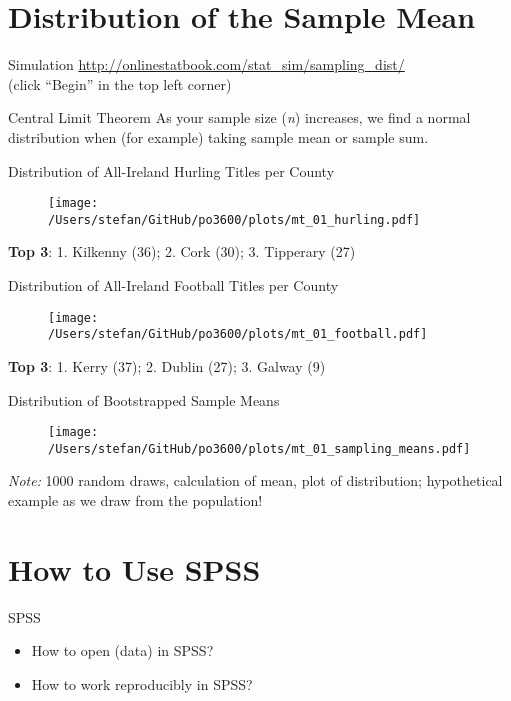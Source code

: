 \documentclass[10pt]{beamer}
\begin{document}
\section{Distribution of the Sample Mean}

\begin{frame}{Simulation}
\url{http://onlinestatbook.com/stat_sim/sampling_dist/} \\
(click ``Begin'' in the top left corner)
\end{frame}

\begin{frame}{Central Limit Theorem}
As your sample size (\textit{n}) increases, we find a normal distribution when (for example) taking sample mean or sample sum.

\end{frame}

\begin{frame}{Distribution of All-Ireland Hurling Titles per County}

\begin{figure} \centering
\texttt{[image: /Users/stefan/GitHub/po3600/plots/mt\_01\_hurling.pdf]}
\end{figure}
\textbf{Top 3}: 1. Kilkenny (36); 2. Cork (30); 3. Tipperary (27)
\end{frame}

\begin{frame}{Distribution of All-Ireland Football Titles per County}

\begin{figure} \centering
\texttt{[image: /Users/stefan/GitHub/po3600/plots/mt\_01\_football.pdf]}
\end{figure}
\textbf{Top 3}: 1. Kerry (37); 2. Dublin (27); 3. Galway (9)
\end{frame}

\begin{frame}{Distribution of Bootstrapped Sample Means}

\begin{figure} \centering
\texttt{[image: /Users/stefan/GitHub/po3600/plots/mt\_01\_sampling\_means.pdf]}
\end{figure}
\textit{Note:} 1000 random draws, calculation of mean, plot of distribution; hypothetical example as we draw from the population!
\end{frame}


\section{How to Use SPSS}
\begin{frame}{SPSS}
\begin{itemize}
\item How to open (data) in SPSS?
\item How to work reproducibly in SPSS?
\end{itemize}
\end{frame}
\end{document}
